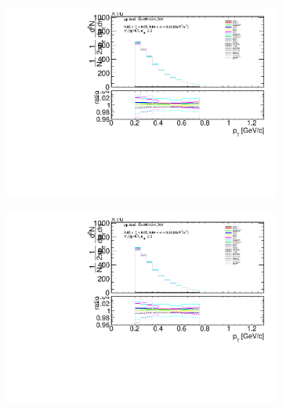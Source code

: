 \begin{figure}[h!]
	\centering
		\begin{subfigure}{.49\textwidth}
			\includegraphics[width=\textwidth,page=37]{chapters/chrgSTAR/img/syst/outPID_SDT_ratio.pdf}
		\end{subfigure}
		\begin{subfigure}{.49\textwidth}
			\includegraphics[width=\textwidth,page=38]{chapters/chrgSTAR/img/syst/outPID_SDT_ratio.pdf}
		\end{subfigure}
		\begin{subfigure}{.49\textwidth}

\end{subfigure}
\end{figure}

